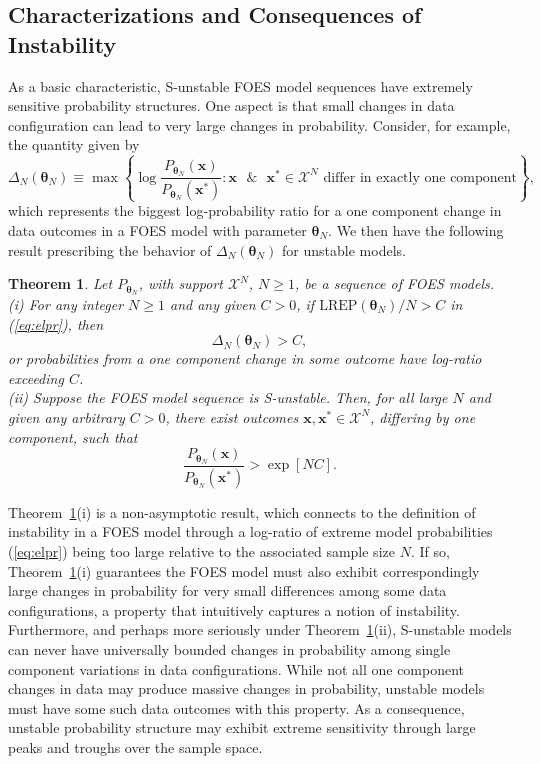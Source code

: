 \documentclass[12pt]{article}
\theoremstyle{definition}
\newcommand{\REP}{\mathrm{LREP}}
\newcommand{\DN}{\Delta_N}
\begin{document}
\subsection{Characterizations and Consequences of Instability}


  As a basic characteristic, S-unstable FOES model sequences  have extremely sensitive probability structures.  One aspect is that small changes in data configuration can   lead to very large changes in probability. Consider, for example, the quantity given by
$$
\DN(\boldsymbol \theta_N) \equiv \max \left\{\log \frac{P_{\boldsymbol \theta_N}(\boldsymbol x)}{P_{\boldsymbol \theta_N}(\boldsymbol x^*)} : \boldsymbol x \text{ }\& \text{ } \boldsymbol x^* \in \mathcal{X}^N \text{ differ in exactly one component}\right\},
$$
which represents the biggest log-probability ratio for a one component change in data outcomes in a FOES model with parameter $\boldsymbol \theta_N$.  We then have the following result prescribing the behavior of $\DN(\boldsymbol \theta_N)$ for   unstable models.



\newtheorem{theorem1}{Theorem}

\begin{theorem1}
\label{instab-elpr}  {\it Let $P_{\boldsymbol \theta_N}$, with support $\mathcal{X}^N$, $N\geq 1$, be a sequence of FOES models. \\
(i)   For any integer $N \geq 1$ and  any given $C>0$, if $\REP(\boldsymbol \theta_N)/N > C$ in (\ref{eq:elpr}), then
\[\DN(\boldsymbol \theta_N) > C,\]
or probabilities from a one component change in some outcome have    log-ratio  exceeding $C$.\\
(ii) Suppose the FOES model sequence is S-unstable.  Then,  for all large $N$ and given any arbitrary $C>0$,   there exist outcomes $\boldsymbol x,\boldsymbol x^*\in\mathcal{X}^N$, differing by one component, such that
\[
 \frac{P_{\boldsymbol \theta_N}(\boldsymbol x)}{P_{\boldsymbol \theta_N}(\boldsymbol x^*)} > \exp[N C].
\]}
\end{theorem1}

Theorem~\ref{instab-elpr}(i) is a  non-asymptotic  result,  which connects to the definition of instability in a FOES model through a log-ratio of extreme model probabilities (\ref{eq:elpr}) being too large relative to the associated sample size $N$.   If so,  Theorem~\ref{instab-elpr}(i) guarantees the FOES model must also exhibit correspondingly large changes in probability for very small differences among some data configurations, a property that intuitively captures a notion of instability.  Furthermore, and perhaps more seriously under
Theorem~\ref{instab-elpr}(ii),
S-unstable models can never have universally bounded changes in probability among single component variations in data configurations. While not all one component changes in data may produce massive changes in probability, unstable models must have some such data outcomes with this property.  As a consequence, unstable probability structure may exhibit extreme sensitivity through large peaks and troughs over the sample space.
\end{document}
